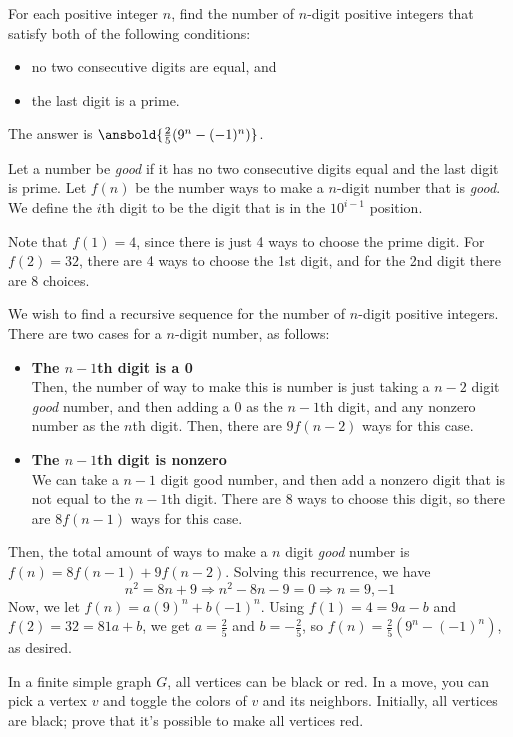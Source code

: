 \documentclass[mast]{lucky}
\begin{document}
\begin{exam}[JMO 2018/1]
For each positive integer $n$, find the number of $n$-digit positive integers that satisfy both of the following conditions:\begin{itemize}\item no two consecutive digits are equal, and\item the last digit is a prime.\end{itemize}
\end{exam}

\begin{sol}
The answer is $\ansbold{\frac{2}{5}(9^n-(-1)^n)}$.

Let a number be \textit{good} if it has no two consecutive digits equal and the last digit is prime. Let $f(n)$ be the number ways to make a $n$-digit number that is \textit{good}. We define the $i$th digit to be the digit that is in the $10^{i-1}$ position.

Note that $f(1)=4$, since there is just 4 ways to choose the prime digit. For $f(2)=32$, there are 4 ways to choose the 1st digit, and for the 2nd digit there are 8 choices.

We wish to find a recursive sequence for the number of $n$-digit positive integers. There are two cases for a $n$-digit number, as follows:
\begin{itemize}
    \item \textbf{The $n-1$th digit is a 0} \\
     Then, the number of way to make this is number is just taking a $n-2$ digit \textit{good} number, and then adding a 0 as the $n-1$th digit, and any nonzero number as the $n$th digit. Then, there are $9f(n-2)$ ways for this case.
    \item \textbf{The $n-1$th digit is nonzero} \\
    We can take a $n-1$ digit good number, and then add a nonzero digit that is not equal to the $n-1$th digit. There are 8 ways to choose this digit, so there are $8f(n-1)$ ways for this case.
\end{itemize}
Then, the total amount of ways to make a $n$ digit \textit{good} number is $f(n)=8f(n-1)+9f(n-2)$. Solving this recurrence, we have
\[n^2=8n+9 \Rightarrow n^2-8n-9=0 \Rightarrow n=9, -1\]
Now, we let $f(n)=a(9)^n+b(-1)^n$. Using $f(1)=4=9a-b$ and $f(2)=32=81a+b$, we get $a=\frac{2}{5}$ and $b=-\frac{2}{5}$, so $f(n)=\frac{2}{5}(9^n-(-1)^n)$, as desired.
\end{sol}

\begin{exam}
In a finite simple graph $G$, all vertices can be black or red. In a move, you can pick a vertex $v$ and toggle the colors of $v$ and its neighbors. Initially, all vertices are black; prove that it's possible to make all vertices red.
\end{exam}
\end{document}
